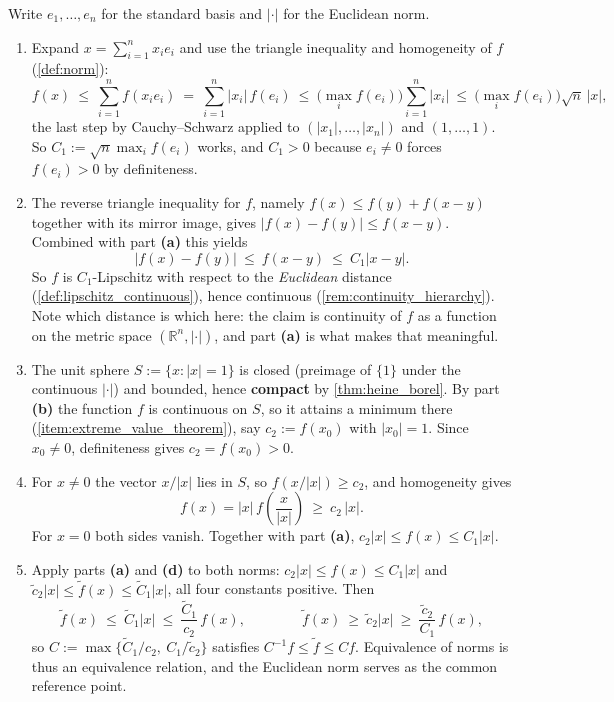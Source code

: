 \begin{exercisesolution}
\label{sol:norm_equivalence_rn}
Write $e_1,\dots,e_n$ for the standard basis and $|\cdot|$ for the Euclidean norm.
\begin{enumerate}[label=\textbf{(\alph*)}]
  \item Expand $x = \sum_{i=1}^n x_ie_i$ and use the triangle inequality and homogeneity of $f$
    (\cref{def:norm}):
    \[f(x) \ \leq\ \sum_{i=1}^n f(x_ie_i) \ =\ \sum_{i=1}^n |x_i|\,f(e_i)
      \ \leq\ \Big(\max_i f(e_i)\Big)\sum_{i=1}^n|x_i|
      \ \leq\ \Big(\max_i f(e_i)\Big)\sqrt n\,|x|,\]
    the last step by Cauchy--Schwarz applied to $(|x_1|,\dots,|x_n|)$ and $(1,\dots,1)$. So
    $C_1 := \sqrt n \max_i f(e_i)$ works, and $C_1 > 0$ because $e_i \neq 0$ forces
    $f(e_i) > 0$ by definiteness.
  \item The reverse triangle inequality for $f$, namely $f(x) \leq f(y) + f(x-y)$ together with
    its mirror image, gives $|f(x)-f(y)| \leq f(x-y)$. Combined with part \textbf{(a)} this
    yields
    \[|f(x)-f(y)| \ \leq\ f(x-y) \ \leq\ C_1|x-y|.\]
    So $f$ is $C_1$-Lipschitz with respect to the \emph{Euclidean} distance
    (\cref{def:lipschitz_continuous}), hence continuous (\cref{rem:continuity_hierarchy}). Note
    which distance is which here: the claim is continuity of $f$ as a function on the metric
    space $(\mathbb{R}^n, |\cdot|)$, and part \textbf{(a)} is what makes that meaningful.
  \item The unit sphere $S := \{x : |x| = 1\}$ is closed (preimage of $\{1\}$ under the
    continuous $|\cdot|$) and bounded, hence \textbf{compact} by \cref{thm:heine_borel}. By part
    \textbf{(b)} the function $f$ is continuous on $S$, so it attains a minimum there
    (\cref{item:extreme_value_theorem}), say $c_2 := f(x_0)$ with $|x_0| = 1$. Since $x_0 \neq 0$,
    definiteness gives $c_2 = f(x_0) > 0$.
  \item For $x \neq 0$ the vector $x/|x|$ lies in $S$, so $f(x/|x|) \geq c_2$, and homogeneity
    gives
    \[f(x) = |x|\,f\!\left(\frac{x}{|x|}\right) \ \geq\ c_2\,|x|.\]
    For $x = 0$ both sides vanish. Together with part \textbf{(a)},
    $c_2|x| \leq f(x) \leq C_1|x|$.
  \item Apply parts \textbf{(a)} and \textbf{(d)} to both norms: $c_2|x| \leq f(x) \leq C_1|x|$ and
    $\tilde c_2|x| \leq \tilde f(x) \leq \tilde C_1|x|$, all four constants positive. Then
    \[\tilde f(x) \ \leq\ \tilde C_1|x| \ \leq\ \frac{\tilde C_1}{c_2}\,f(x),
      \qquad\qquad
      \tilde f(x) \ \geq\ \tilde c_2|x| \ \geq\ \frac{\tilde c_2}{C_1}\,f(x),\]
    so $C := \max\big\{\tilde C_1/c_2,\ C_1/\tilde c_2\big\}$ satisfies
    $C^{-1}f \leq \tilde f \leq Cf$. Equivalence of norms is thus an equivalence relation, and
    the Euclidean norm serves as the common reference point.
\end{enumerate}


\end{exercisesolution}

